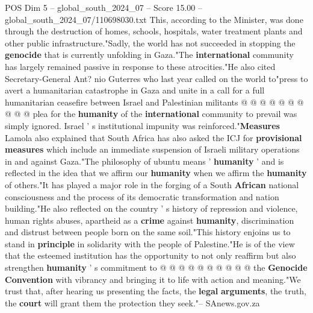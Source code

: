 \begin{textsample}{POS Dim 5 – global\_south\_2024\_07 – Score 15.00 – global\_south\_2024\_07/110698030.txt}
This, according to the Minister, was done through the destruction of homes, schools, hospitals, water treatment plants and other public infrastructure."Sadly, the world has not succeeded in stopping the \textbf{genocide} that is currently unfolding in Gaza."The \textbf{international} community has largely remained passive in response to these atrocities."He also cited Secretary-General Ant? nio Guterres who last year called on the world to"press to avert a humanitarian catastrophe in Gaza and unite in a call for a full humanitarian ceasefire between Israel and Palestinian militants @ @ @ @ @ @ @ @ @ @ plea for the \textbf{humanity} of the \textbf{international} community to prevail was simply ignored.
Israel ' s institutional impunity was reinforced."\textbf{Measures} Lamola also explained that South Africa has also asked the ICJ for \textbf{provisional} \textbf{measures} which include an immediate suspension of Israeli military operations in and against Gaza."The philosophy of ubuntu means ' \textbf{humanity} ' and is reflected in the idea that we affirm our \textbf{humanity} when we affirm the \textbf{humanity} of others."It has played a major role in the forging of a South \textbf{African} national consciousness and the process of its democratic transformation and nation building."He also reflected on the country ' s history of repression and violence, human rights abuses, apartheid as a \textbf{crime} against \textbf{humanity}, discrimination and distrust between people born on the same soil."This history enjoins us to stand in \textbf{principle} in solidarity with the people of Palestine."He is of the view that the esteemed institution has the opportunity to not only reaffirm but also strengthen \textbf{humanity} ' s commitment to @ @ @ @ @ @ @ @ @ @ the \textbf{Genocide} \textbf{Convention} with vibrancy and bringing it to life with action and meaning."We trust that, after hearing us presenting the facts, the \textbf{legal} \textbf{arguments}, the truth, the \textbf{court} will grant them the protection they seek."-- SAnews.gov.za

\end{textsample}
